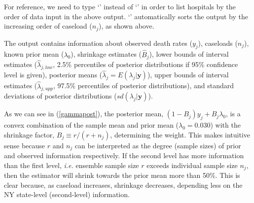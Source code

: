 \documentclass[article]{jss}
\begin{document}
For reference, we need to type `' instead of `' in order to list hospitals by the order of data input in the above output. `' automatically sorts the output by the increasing order of caseload ($n_{j}$), as shown above.


The output contains information about observed death rates ($y_{j}$), caseloads ($n_{j}$), known prior mean ($\lambda_{0}$), shrinkage estimates ($\hat{B}_{j}$), lower bounds of interval estimates ($\hat{\lambda}_{j, low}$, 2.5\% percentiles of posterior distributions if 95\% confidence level is given), posterior means ($\hat{\lambda}_{j}=E(\lambda_{j}\vert \textbf{y})$), upper bounds  of interval estimates ($\hat{\lambda}_{j, upp}$, 97.5\% percentiles of posterior distributions), and standard deviations of posterior distributions ($sd(\lambda_{j}\vert \textbf{y})$).


As we can see in (\ref{gammapost}), the posterior mean, $(1-B_{j})y_{j} + B_{j}\lambda_{0}$, is a convex combination of the sample mean and prior mean ($\lambda_{0}=0.030$) with the shrinkage factor, $B_{j}\equiv r / (r + n_{j})$, determining the weight. This makes intuitive sense because $r$ and $n_{j}$ can be interpreted as the degree (sample sizes) of prior and observed information respectively. If the second level has more information than the first level, \emph{i.e.} ensemble sample size $r$ exceeds individual sample size $n_{j}$, then the estimator will shrink towards the prior mean more than 50\%. This is clear because, as caseload increases, shrinkage decreases, depending less on the NY state-level (second-level) information.
\end{document}
